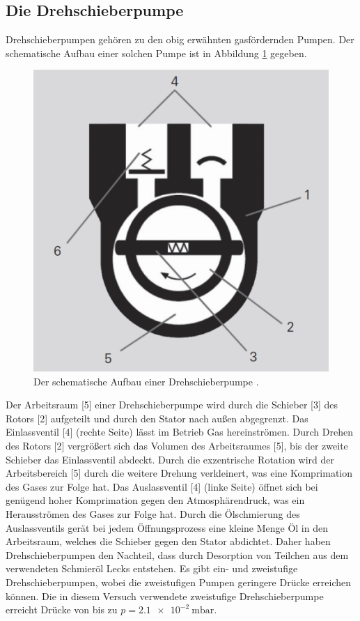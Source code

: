 \subsection{Die Drehschieberpumpe}
Drehschieberpumpen gehören zu den obig erwähnten gasfördernden Pumpen. Der schematische
Aufbau einer solchen Pumpe ist in Abbildung \ref{fig:drehschieber} gegeben.
\begin{figure}[H]
  \centering
  \caption{Der schematische Aufbau einer Drehschieberpumpe \cite{pfeiffer}.}
  \label{fig:drehschieber}
  \includegraphics[scale=0.3]{pictures/drehschieber.png}
\end{figure}
\noindent
Der Arbeitsraum [5] einer Drehschieberpumpe wird durch die Schieber [3] des
Rotors [2] aufgeteilt und durch den Stator nach außen abgegrenzt.
Das Einlassventil [4] (rechte Seite) lässt im Betrieb Gas hereinströmen.
Durch Drehen des Rotors [2] vergrößert sich das Volumen des Arbeitsraumes [5], bis der zweite Schieber
das Einlassventil abdeckt. Durch die exzentrische Rotation wird der Arbeitsbereich [5] durch die
weitere Drehung verkleinert, was eine Komprimation des Gases zur Folge hat. Das Auslassventil [4] (linke Seite)
öffnet sich bei genügend hoher Komprimation gegen den Atmosphärendruck, was ein Herausströmen des Gases zur
Folge hat. Durch die Ölschmierung des Auslassventils gerät bei jedem Öffnungsprozess eine
kleine Menge Öl in den Arbeitsraum, welches die Schieber gegen den Stator abdichtet. Daher haben
Drehschieberpumpen den Nachteil, dass durch Desorption von Teilchen aus dem verwendeten Schmieröl Lecks
entstehen. Es gibt ein- und
zweistufige Drehschieberpumpen, wobei die zweistufigen Pumpen geringere Drücke erreichen können.
Die in diesem Versuch verwendete zweistufige Drehschieberpumpe erreicht Drücke
von bis zu $p = \SI{2.1 e-2}{\milli\bar}$.

